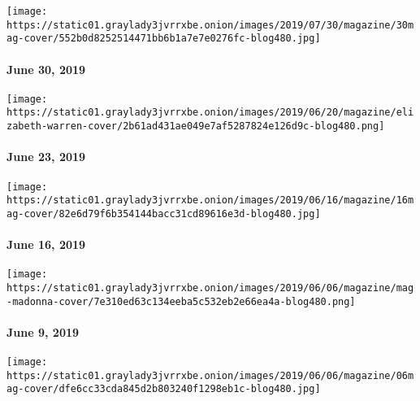 \href{https://www.nytimes3xbfgragh.onion/issue/magazine/2019/07/01/the-63019-issue}{}

\texttt{[image: https://static01.graylady3jvrrxbe.onion/images/2019/07/30/magazine/30mag-cover/552b0d8252514471bb6b1a7e7e0276fc-blog480.jpg]}

\hypertarget{june-30-2019}{%
\paragraph{June 30, 2019}\label{june-30-2019}}

\href{https://www.nytimes3xbfgragh.onion/issue/magazine/2019/06/25/the-62319-issue}{}

\texttt{[image: https://static01.graylady3jvrrxbe.onion/images/2019/06/20/magazine/elizabeth-warren-cover/2b61ad431ae049e7af5287824e126d9c-blog480.png]}

\hypertarget{june-23-2019}{%
\paragraph{June 23, 2019}\label{june-23-2019}}

\href{https://www.nytimes3xbfgragh.onion/issue/magazine/2019/06/25/the-61619-issue}{}

\texttt{[image: https://static01.graylady3jvrrxbe.onion/images/2019/06/16/magazine/16mag-cover/82e6d79f6b354144bacc31cd89616e3d-blog480.jpg]}

\hypertarget{june-16-2019}{%
\paragraph{June 16, 2019}\label{june-16-2019}}

\href{https://www.nytimes3xbfgragh.onion/issue/magazine/2019/06/25/the-6919-issue}{}

\texttt{[image: https://static01.graylady3jvrrxbe.onion/images/2019/06/06/magazine/mag-madonna-cover/7e310ed63c134eeba5c532eb2e66ea4a-blog480.png]}

\hypertarget{june-9-2019}{%
\paragraph{June 9, 2019}\label{june-9-2019}}

\href{https://www.nytimes3xbfgragh.onion/issue/magazine/2019/06/06/the-60219-issue}{}

\texttt{[image: https://static01.graylady3jvrrxbe.onion/images/2019/06/06/magazine/06mag-cover/dfe6cc33cda845d2b803240f1298eb1c-blog480.jpg]}

